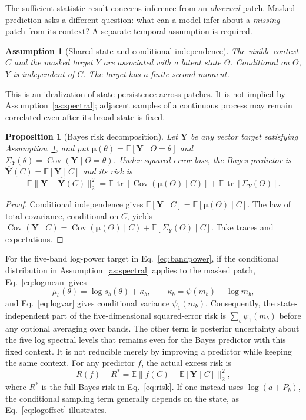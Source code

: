 \documentclass[11pt,a4paper]{article}
\newtheorem{assumption}{Assumption}
\newtheorem{proposition}{Proposition}
\newcommand{\E}{\mathbb{E}}
\newcommand{\Cov}{\operatorname{Cov}}
\newcommand{\tr}{\operatorname{tr}}
\begin{document}
The sufficient-statistic result concerns inference from an \emph{observed} patch.
Masked prediction asks a different question: what can a model infer about a
\emph{missing} patch from its context? A separate temporal assumption is required.

\begin{assumption}[Shared state and conditional independence]\label{as:context}
The visible context $C$ and the masked target $Y$ are associated with a latent
state $\Theta$. Conditional on $\Theta$, $Y$ is independent of $C$. The target
has a finite second moment.
\end{assumption}

This is an idealization of state persistence across patches. It is not implied
by Assumption~\ref{as:spectral}; adjacent samples of a continuous process may
remain correlated even after its broad state is fixed.

\begin{proposition}[Bayes risk decomposition]\label{prop:risk}
Let $\bm Y$ be any vector target satisfying Assumption~\ref{as:context}, and put
$\bm\mu(\theta)=\E[\bm Y\mid\Theta=\theta]$ and
$\Sigma_Y(\theta)=\Cov(\bm Y\mid\Theta=\theta)$. Under squared-error loss,
the Bayes predictor is $\widehat{\bm Y}(C)=\E[\bm Y\mid C]$ and its risk is
\begin{equation}
\E\|\bm Y-\widehat{\bm Y}(C)\|_2^2
=\E\,\tr\!\left[\Cov\!\left(\bm\mu(\Theta)\mid C\right)\right]
+\E\,\tr\!\left[\Sigma_Y(\Theta)\right].
\label{eq:risk}
\end{equation}
\end{proposition}
\begin{proof}
Conditional independence gives
$\E[\bm Y\mid C]=\E[\bm\mu(\Theta)\mid C]$.
The law of total covariance, conditional on $C$, yields
$\Cov(\bm Y\mid C)=\Cov(\bm\mu(\Theta)\mid C)
+\E[\Sigma_Y(\Theta)\mid C]$.
Take traces and expectations.
\end{proof}

For the five-band log-power target in Eq.~\eqref{eq:bandpower}, if the
conditional distribution in Assumption~\ref{as:spectral} applies to the masked
patch, Eq.~\eqref{eq:logmean} gives
\begin{equation}
\mu_b(\theta)=\log s_b(\theta)+\kappa_b,
\qquad\kappa_b=\psi(m_b)-\log m_b,
\label{eq:mu}
\end{equation}
and Eq.~\eqref{eq:logvar} gives conditional variance $\psi_1(m_b)$.
Consequently, the state-independent part of the five-dimensional squared-error
risk is $\sum_b\psi_1(m_b)$ before any optional averaging over bands.
The other term is posterior uncertainty about the five log spectral levels that
remains even for the Bayes predictor with this fixed context. It is not reducible
merely by improving a predictor while keeping the same context. For any predictor
$f$, the actual excess risk is
\begin{equation}
R(f)-R^*=\E\|f(C)-\E[\bm Y\mid C]\|_2^2,
\end{equation}
where $R^*$ is the full Bayes risk in Eq.~\eqref{eq:risk}.
If one instead uses $\log(a+P_b)$, the conditional sampling term generally
depends on the state, as Eq.~\eqref{eq:logoffset} illustrates.
\end{document}
